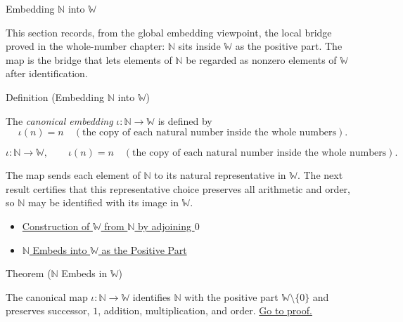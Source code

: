 \label{sec:embedding-n-into-w}

\begin{topicbox}{Embedding $\mathbb{N}$ into $\mathbb{W}$}
\begin{exposition}
This section records, from the global embedding viewpoint, the local bridge
proved in the whole-number chapter: $\mathbb{N}$ sits inside $\mathbb{W}$ as
the positive part. The map is the bridge that lets elements of $\mathbb{N}$ be
regarded as nonzero elements of $\mathbb{W}$ after identification.
\end{exposition}
\end{topicbox}
\begin{definitionbox}{Definition (Embedding $\mathbb{N}$ into $\mathbb{W}$)}
\begin{definition}
\label{def:embedding-n-into-w}
The \emph{canonical embedding} $\iota:\mathbb{N}\to \mathbb{W}$ is defined by
\[
\iota(n)=n \quad(\text{the copy of each natural number inside the whole numbers}).
\]
\end{definition}
\end{definitionbox}
\begin{remark*}
\[
\iota:\mathbb{N}\to \mathbb{W},\qquad \iota(n)=n \quad(\text{the copy of each natural number inside the whole numbers}).
\]
\end{remark*}
\begin{remark*}[Interpretation]
The map sends each element of $\mathbb{N}$ to its natural representative in $\mathbb{W}$. The next result certifies that this representative choice preserves all arithmetic and order, so $\mathbb{N}$ may be identified with its image in $\mathbb{W}$.
\end{remark*}
\begin{dependencies}
\begin{itemize}
  \item \hyperref[def:whole-numbers]{Construction of $\mathbb{W}$ from $\mathbb{N}$ by adjoining $0$}
  \item \hyperref[thm:n-embeds-into-w-as-positive-part]{$\mathbb{N}$ Embeds into $\mathbb{W}$ as the Positive Part}
\end{itemize}
\end{dependencies}
\begin{theorembox}{Theorem ($\mathbb{N}$ Embeds in $\mathbb{W}$)}
\begin{theorem}
\label{thm:n-embeds-in-w}
The canonical map $\iota:\mathbb{N}\to \mathbb{W}$ identifies $\mathbb{N}$ with
the positive part $\mathbb{W}\setminus\{0\}$ and preserves successor, $1$,
addition, multiplication, and order.
\hyperref[prf:n-embeds-in-w]{Go to proof.}
\end{theorem}
\end{theorembox}

